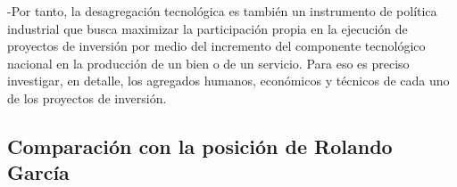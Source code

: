 -Por tanto, la desagregación tecnológica es también un instrumento de política industrial que busca maximizar
la participación propia en la ejecución de proyectos de inversión por medio del incremento del componente tecnológico
 nacional en la producción de un bien o de un servicio. Para eso es preciso investigar, en detalle, los agregados humanos,
  económicos y técnicos de cada uno de los proyectos de inversión.


\subsection*{Comparación con la posición de Rolando García}
